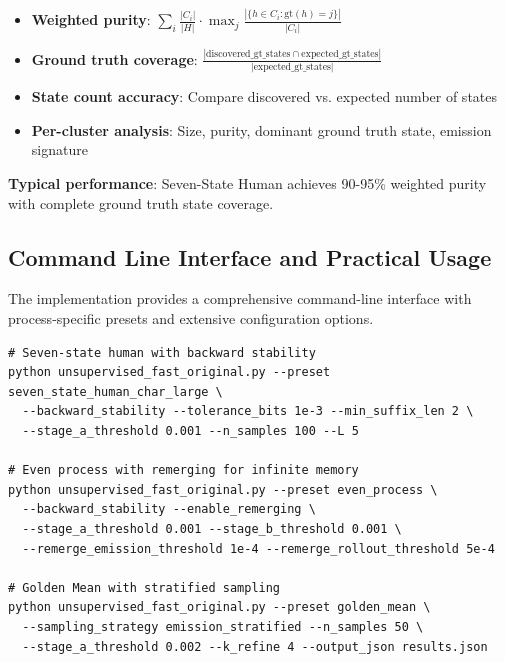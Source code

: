 \documentclass[11pt]{article}
\begin{document}
\begin{resultbox}
\begin{itemize}
\item \textbf{Weighted purity}: $\sum_i \frac{|C_i|}{|H|} \cdot \max_j \frac{|\{h \in C_i : \text{gt}(h) = j\}|}{|C_i|}$
\item \textbf{Ground truth coverage}: $\frac{|\text{discovered\_gt\_states} \cap \text{expected\_gt\_states}|}{|\text{expected\_gt\_states}|}$
\item \textbf{State count accuracy}: Compare discovered vs. expected number of states
\item \textbf{Per-cluster analysis}: Size, purity, dominant ground truth state, emission signature
\end{itemize}

\textbf{Typical performance}: Seven-State Human achieves 90-95\% weighted purity with complete ground truth state coverage.
\end{resultbox}

\subsection{Command Line Interface and Practical Usage}

The implementation provides a comprehensive command-line interface with process-specific presets and extensive configuration options.

\begin{codebox}
\begin{lstlisting}
# Seven-state human with backward stability
python unsupervised_fast_original.py --preset seven_state_human_char_large \
  --backward_stability --tolerance_bits 1e-3 --min_suffix_len 2 \
  --stage_a_threshold 0.001 --n_samples 100 --L 5

# Even process with remerging for infinite memory
python unsupervised_fast_original.py --preset even_process \
  --backward_stability --enable_remerging \
  --stage_a_threshold 0.001 --stage_b_threshold 0.001 \
  --remerge_emission_threshold 1e-4 --remerge_rollout_threshold 5e-4

# Golden Mean with stratified sampling
python unsupervised_fast_original.py --preset golden_mean \
  --sampling_strategy emission_stratified --n_samples 50 \
  --stage_a_threshold 0.002 --k_refine 4 --output_json results.json
\end{lstlisting}
\end{codebox}
\end{document}
